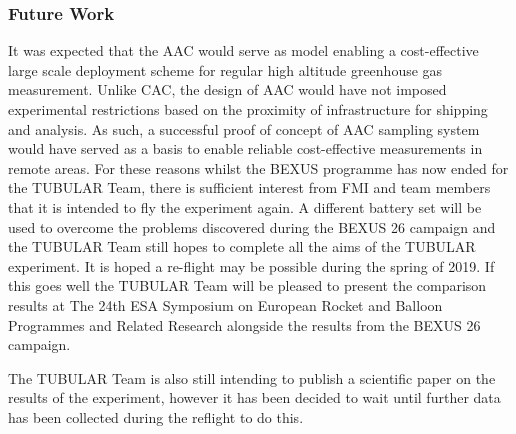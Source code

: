 \subsubsection{Future Work}\label{sec:futurework}


It was expected that the AAC would serve as model enabling a cost-effective large scale deployment scheme for regular high altitude greenhouse gas measurement. Unlike CAC, the design of AAC would have not imposed experimental restrictions based on the proximity of infrastructure for shipping and analysis. As such, a successful proof of concept of AAC sampling system would have served as a basis to enable reliable cost-effective measurements in remote areas. For these reasons whilst the BEXUS programme has now ended for the TUBULAR Team, there is sufficient interest from FMI and team members that it is intended to fly the experiment again. A different battery set will be used to overcome the problems discovered during the BEXUS 26 campaign and the TUBULAR Team still hopes to complete all the aims of the TUBULAR experiment. It is hoped a re-flight may be possible during the spring of 2019. If this goes well the TUBULAR Team will be pleased to present the comparison results at The 24th ESA Symposium on European Rocket and Balloon Programmes and Related Research alongside the results from the BEXUS 26 campaign. 

The TUBULAR Team is also still intending to publish a scientific paper on the results of the experiment, however it has been decided to wait until further data has been collected during the reflight to do this. 
